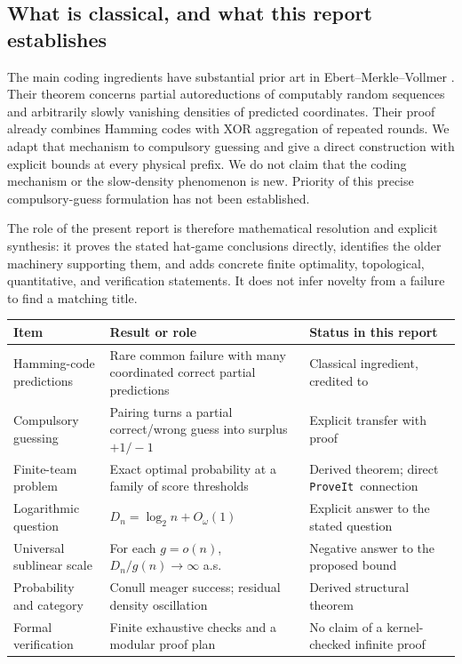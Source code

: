 \documentclass[11pt,letterpaper]{article}
\theoremstyle{definition}
\newcommand{\repo}{\texttt{ProveIt}}
\begin{document}
\subsection{What is classical, and what this report establishes}

The main coding ingredients have substantial prior art in
Ebert--Merkle--Vollmer \cite[Theorem~6.6]{hat:EMV}. Their theorem concerns
partial autoreductions of computably random sequences and arbitrarily
slowly vanishing densities of predicted coordinates. Their proof
already combines Hamming codes with XOR aggregation of repeated rounds.
We adapt that mechanism to compulsory guessing and give a direct
construction with explicit bounds at every physical prefix. We do not
claim that the coding mechanism or the slow-density phenomenon is new.
Priority of this precise compulsory-guess formulation has not been
established.

The role of the present report is therefore mathematical resolution and
explicit synthesis: it proves the stated hat-game conclusions directly,
identifies the older machinery supporting them, and adds concrete
finite optimality, topological, quantitative, and verification statements.
It does not infer novelty from a failure to find a matching title.

\begin{longtable}{>{\raggedright\arraybackslash}p{}
>{\raggedright\arraybackslash}p{}
>{\raggedright\arraybackslash}p{}}
\toprule
Item & Result or role & Status in this report\\
\midrule
\endhead
Hamming-code predictions &
Rare common failure with many coordinated correct partial predictions &
Classical ingredient, credited to \cite{hat:EMV}\\
Compulsory guessing &
Pairing turns a partial correct/wrong guess into surplus \(+1/-1\) &
Explicit transfer with proof\\
Finite-team problem &
Exact optimal probability at a family of score thresholds &
Derived theorem; direct \repo\ connection\\
Logarithmic question &
\(D_n=\log_2 n+O_\omega(1)\) &
Explicit answer to the stated question\\
Universal sublinear scale &
For each \(g=o(n)\), \(D_n/g(n)\to\infty\) a.s. &
Negative answer to the proposed bound\\
Probability and category &
Conull meager success; residual density oscillation &
Derived structural theorem\\
Formal verification &
Finite exhaustive checks and a modular proof plan &
No claim of a kernel-checked infinite proof\\
\bottomrule
\end{longtable}
\end{document}
